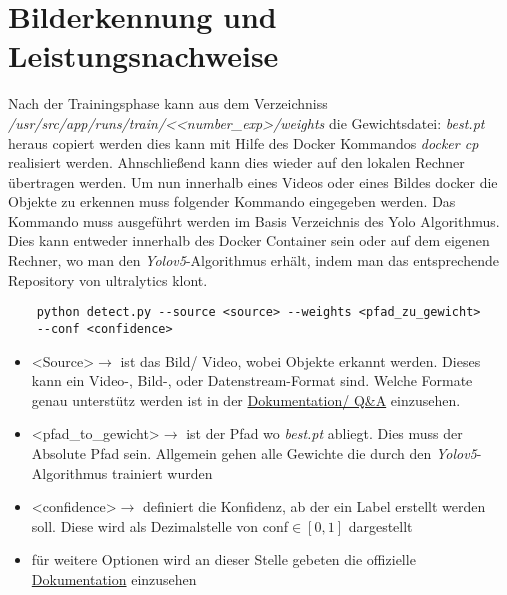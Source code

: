 \chapter{Bilderkennung und Leistungsnachweise}
Nach der Trainingsphase kann aus dem Verzeichniss \textit{/usr/src/app/runs/train/<\textless number\_exp\textgreater/weights} die Gewichtsdatei: \textit{best.pt} heraus copiert werden dies kann mit Hilfe des Docker Kommandos \textit{docker cp} realisiert werden. Ahnschließend kann dies wieder auf den lokalen Rechner übertragen werden. Um nun innerhalb eines Videos oder eines Bildes docker die Objekte zu erkennen muss folgender Kommando eingegeben werden. Das Kommando muss ausgeführt werden im Basis Verzeichnis des Yolo Algorithmus. Dies kann entweder innerhalb des Docker Container sein oder auf dem eigenen Rechner, wo man den \textit{Yolov5}-Algorithmus erhält, indem man das entsprechende Repository von ultralytics klont.

\begin{verbatim}
    python detect.py --source <source> --weights <pfad_zu_gewicht> 
    --conf <confidence>
\end{verbatim}

\begin{itemize}
    \item \textless Source\textgreater $\rightarrow$ ist das Bild/ Video, wobei Objekte erkannt werden. Dieses kann ein Video-, Bild-, oder Datenstream-Format sind. Welche Formate genau unterstütz werden ist in der \href{https://github.com/ultralytics/yolov5/issues/6855}{Dokumentation/ Q\&A} einzusehen.
    \item \textless pfad\_to\_gewicht\textgreater $\rightarrow$ ist der Pfad wo \textit{best.pt} abliegt. Dies muss der Absolute Pfad sein. Allgemein gehen alle Gewichte die durch den \textit{Yolov5}-Algorithmus trainiert wurden
    \item \textless confidence\textgreater  $\rightarrow$ definiert die Konfidenz, ab der ein Label erstellt werden soll. Diese wird als Dezimalstelle von conf$\in [0,1]$ dargestellt
    \item für weitere Optionen wird an dieser Stelle gebeten die offizielle \href{https://github.com/ultralytics/yolov5/blob/master/detect.py}{Dokumentation} einzusehen
\end{itemize}